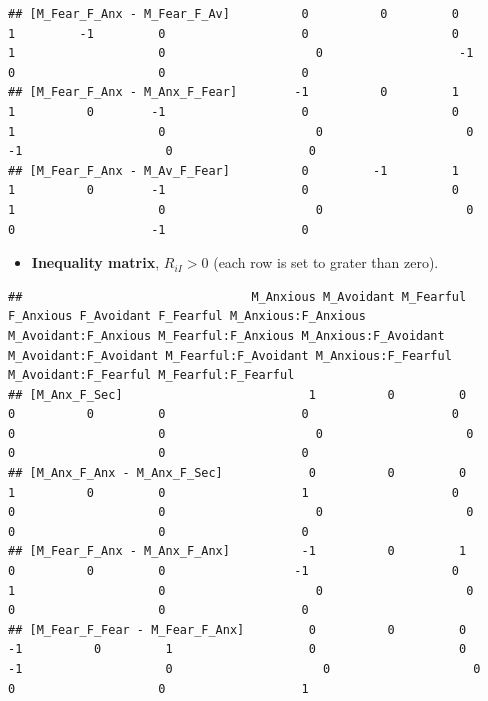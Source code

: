 \documentclass[
]{book}
\providecommand{\tightlist}{%
  \setlength{\itemsep}{0pt}\setlength{\parskip}{0pt}}
\begin{document}
\begin{verbatim}
## [M_Fear_F_Anx - M_Fear_F_Av]          0          0         0         1         -1         0                   0                    0                   1                    0                     0                   -1                   0                    0                   0
## [M_Fear_F_Anx - M_Anx_F_Fear]        -1          0         1         1          0        -1                   0                    0                   1                    0                     0                    0                  -1                    0                   0
## [M_Fear_F_Anx - M_Av_F_Fear]          0         -1         1         1          0        -1                   0                    0                   1                    0                     0                    0                   0                   -1                   0
\end{verbatim}

\begin{itemize}
\tightlist
\item
  \textbf{Inequality matrix}, \(R_{iI} > 0\) (each row is set to grater than zero).
\end{itemize}

\begin{verbatim}
##                                M_Anxious M_Avoidant M_Fearful F_Anxious F_Avoidant F_Fearful M_Anxious:F_Anxious M_Avoidant:F_Anxious M_Fearful:F_Anxious M_Anxious:F_Avoidant M_Avoidant:F_Avoidant M_Fearful:F_Avoidant M_Anxious:F_Fearful M_Avoidant:F_Fearful M_Fearful:F_Fearful
## [M_Anx_F_Sec]                          1          0         0         0          0         0                   0                    0                   0                    0                     0                    0                   0                    0                   0
## [M_Anx_F_Anx - M_Anx_F_Sec]            0          0         0         1          0         0                   1                    0                   0                    0                     0                    0                   0                    0                   0
## [M_Fear_F_Anx - M_Anx_F_Anx]          -1          0         1         0          0         0                  -1                    0                   1                    0                     0                    0                   0                    0                   0
## [M_Fear_F_Fear - M_Fear_F_Anx]         0          0         0        -1          0         1                   0                    0                  -1                    0                     0                    0                   0                    0                   1
\end{verbatim}
\end{document}
